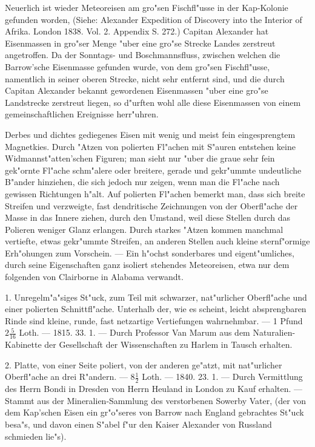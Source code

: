 \documentclass[a4paper, 11pt, oneside, polutonikogreek, german]{article}
\begin{document}
\setlength{\leftskip}{10mm}
\setlength{\parindent}{0pt}

{\footnotesize Neuerlich ist wieder Meteoreisen am gro"sen Fischfl"usse in der Kap-Kolonie gefunden worden, (Siehe: Alexander Expedition of Discovery into the Interior of Afrika. London 1838. Vol. 2. Appendix S. 272.) Capitan Alexander hat Eisenmassen in gro"ser Menge "uber eine gro"se Strecke Landes zerstreut angetroffen. Da der Sonntags- und Boschmannsfluss, zwischen welchen die Barrow'sche Eisenmasse gefunden wurde, von dem gro"sen Fischfl"usse, namentlich in seiner oberen Strecke, nicht sehr entfernt sind, und die durch Capitan Alexander bekannt gewordenen Eisenmassen "uber eine gro"se Landstrecke zerstreut liegen, so d"urften wohl alle diese Eisenmassen von einem gemeinschaftlichen Ereignisse herr"uhren.}

\setlength{\leftskip}{0pt}
\setlength{\parindent}{20pt}

Derbes und dichtes gediegenes Eisen mit wenig und meist fein eingesprengtem Magnetkies. Durch "Atzen von polierten Fl"achen mit S"auren entstehen keine Widmannst"atten'schen Figuren; man sieht nur "uber die graue sehr fein gek"ornte Fl"ache schm"alere oder breitere, gerade und gekr"ummte undeutliche B"ander hinziehen, die sich jedoch nur zeigen, wenn man die Fl"ache nach gewissen Richtungen h"alt. Auf polierten Fl"achen bemerkt man, dass sich breite Streifen und verzweigte, fast dendritische Zeichnungen von der Oberfl"ache der Masse in das Innere ziehen, durch den Umstand, weil diese Stellen durch das Polieren weniger Glanz erlangen. Durch starkes "Atzen kommen manchmal vertiefte, etwas gekr"ummte Streifen, an anderen Stellen auch kleine sternf"ormige Erh"ohungen zum Vorschein. --- Ein h"ochst sonderbares und eigent"umliches, durch seine Eigenschaften ganz isoliert stehendes Meteoreisen, etwa nur dem folgenden von Clairborne in Alabama verwandt.

1. Unregelm"a"siges St"uck, zum Teil mit schwarzer, nat"urlicher Oberfl"ache und einer polierten Schnittfl"ache. Unterhalb der, wie es scheint, leicht absprengbaren Rinde sind kleine, runde, fast netzartige Vertiefungen wahrnehmbar. --- 1 Pfund $\mathfrak{2\frac{5}{16}}$ Loth. --- 1815. 33. 1. --- Durch Professor Van Marum aus dem Naturalien-Kabinette der Gesellschaft der Wissenschaften zu Harlem in Tausch erhalten.

2. Platte, von einer Seite poliert, von der anderen ge"atzt, mit nat"urlicher Oberfl"ache an drei R"andern. --- $\mathfrak{8\frac{1}{2}}$ Loth. --- 1840. 23. 1. --- Durch Vermittlung des Herrn Bondi in Dresden von Herrn Heuland in London zu Kauf erhalten. --- Stammt aus der Mineralien-Sammlung des verstorbenen Sowerby Vater, (der von dem Kap'schen Eisen ein gr"o"seres von Barrow nach England gebrachtes St"uck besa"s, und davon einen S"abel f"ur den Kaiser Alexander von Russland schmieden lie"s).
\end{document}
